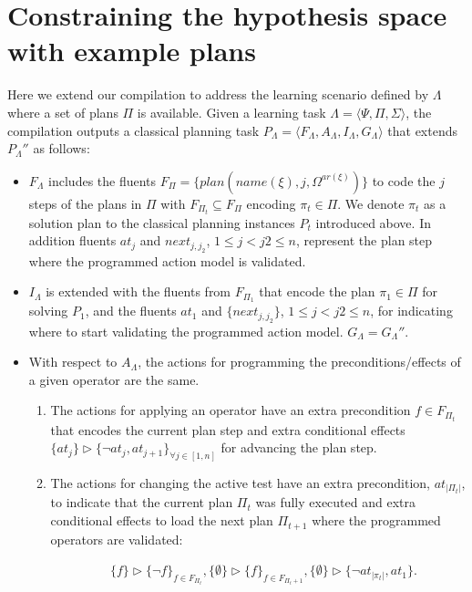\documentclass[letterpaper]{article} %
\newcommand{\tup}[1]{{\langle #1 \rangle}}
\begin{document}
\section{Constraining the hypothesis space with example plans}
Here  we extend our compilation to address the learning scenario defined by $\Lambda$ where a set of plans $\Pi$ is available. Given a learning task $\Lambda=\tup{\Psi,\Pi,\Sigma}$, the compilation outputs a classical planning task $P_{\Lambda}=\tup{F_{\Lambda},A_{\Lambda},I_{\Lambda},G_{\Lambda}}$ that extends $P_{\Lambda}''$ as follows: 
\begin{itemize}
\item $F_{\Lambda}$ includes the fluents $F_{\Pi}=\{plan(name(\xi),j,\Omega^{ar(\xi)})\}$ to code the $j$ steps of the plans in $\Pi$ with $F_{\Pi_t}\subseteq F_{\Pi}$ encoding $\pi_t\in \Pi$. We denote $\pi_t$ as a solution plan to the classical planning instances $P_t$ introduced above. In addition fluents $at_j$ and $next_{j,j_2}$, {\small $1\leq j<j2\leq n$}, represent the plan step where the programmed action model is validated.
\item $I_{\Lambda}$ is extended with the fluents from $F_{\Pi_1}$ that encode the plan $\pi_1\in \Pi$ for solving $P_1$, and the fluents $at_1$ and $\{next_{j,j_2}\}$, {\small $1\leq j<j2\leq n$}, for indicating where to start validating the programmed action model. $G_{\Lambda}=G_{\Lambda}''$.
\item With respect to $A_{\Lambda}$, the actions for programming the preconditions/effects of a given operator are the same.
\begin{enumerate}
\item The actions for applying an operator have an extra precondition $f\in F_{\Pi_t}$ that encodes the current plan step and extra conditional effects $\{at_{j}\}\rhd\{\neg at_{j},at_{j+1}\}_{\forall j\in [1,n]}$ for advancing the plan step.
\item The actions for changing the active test have an extra precondition, $at_{|\Pi_t|}$, to indicate that the current plan $\Pi_t$ was fully executed and extra conditional effects to load the next plan $\Pi_{t+1}$ where the programmed operators are validated:
\begin{small}
\begin{align*}
&\{f\}\rhd\{\neg f\}_{f\in F_{\Pi_t}}, \{\emptyset\}\rhd\{f\}_{f\in F_{\Pi_t+1}},\{\emptyset\}\rhd\{\neg at_{|\pi_t|},at_1\}.
\end{align*}
\end{small}
\end{enumerate}
\end{itemize}
\end{document}

